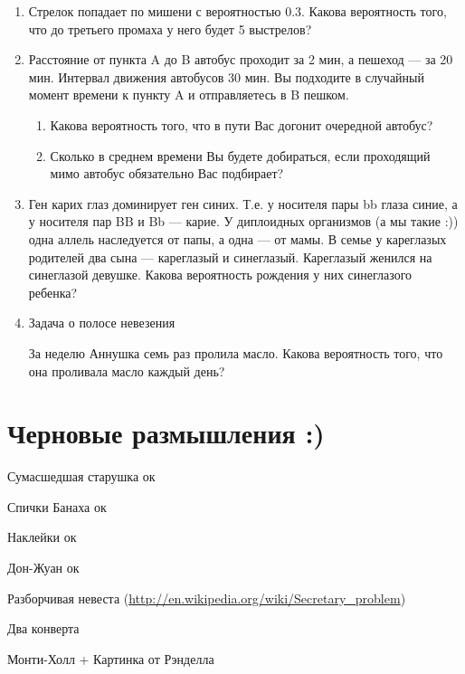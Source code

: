 \documentclass{tufte-handout}
\begin{document}
\begin{enumerate}
\item Стрелок попадает по мишени с вероятностью 0.3. Какова вероятность того, что до третьего промаха у него будет 5 выстрелов?

\item Расстояние от пункта A до B автобус проходит за 2 мин, а пешеход — за 20 мин. Интервал движения автобусов 30 мин. Вы подходите в случайный момент времени к пункту A и отправляетесь в B пешком. 

\begin{enumerate}
\item Какова вероятность того, что в пути Вас догонит очередной автобус?
\item Сколько в среднем времени Вы будете добираться, если проходящий мимо автобус обязательно Вас подбирает?
\end{enumerate}



\item Ген карих глаз доминирует ген синих. Т.е. у носителя пары bb
глаза синие, а у носителя пар BB и Bb --- карие. У диплоидных
организмов (а мы такие :)) одна аллель наследуется от папы, а одна
--- от мамы. В семье у кареглазых родителей два сына --- кареглазый и
синеглазый. Кареглазый женился на синеглазой девушке. Какова
вероятность рождения у них синеглазого ребенка?


\item Задача о полосе невезения

За неделю Аннушка семь раз пролила масло. Какова вероятность того, что она проливала масло каждый день?



\end{enumerate}

\section{Черновые размышления :)}

Сумасшедшая старушка  ок

Спички Банаха  ок

Наклейки ок

Дон-Жуан ок

Разборчивая невеста (\url{http://en.wikipedia.org/wiki/Secretary_problem})

Два конверта

Монти-Холл + Картинка от Рэнделла
\end{document}
